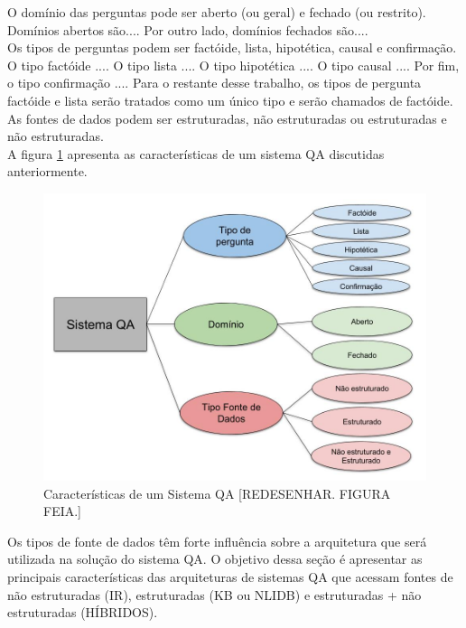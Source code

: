 \documentclass{article}
\begin{document}
O domínio das perguntas pode ser aberto (ou geral) e fechado (ou restrito). Domínios abertos são.... Por outro lado, domínios fechados são....\\

Os tipos de perguntas podem ser factóide, lista, hipotética, causal e confirmação. O tipo factóide .... O tipo lista .... O tipo hipotética .... O tipo causal .... Por fim, o tipo confirmação .... Para o restante desse trabalho, os tipos de pergunta factóide e lista serão tratados como um único tipo e serão chamados de factóide.\\

As fontes de dados podem ser estruturadas, não estruturadas ou estruturadas e não estruturadas.\\

A figura \ref{fig:SistemaQA} apresenta as características de um sistema QA discutidas anteriormente.\\

\begin{figure}[h!]
\centering
\includegraphics[scale=0.2]{SistemaQA2.jpg}
\caption{Características de um Sistema QA [REDESENHAR. FIGURA FEIA.]}
\label{fig:SistemaQA}
\end{figure}

Os tipos de fonte de dados têm forte influência sobre a arquitetura que será utilizada na solução do sistema QA. O objetivo dessa seção é apresentar as principais características das arquiteturas de sistemas QA que acessam fontes de não estruturadas (IR), estruturadas (KB ou NLIDB) e estruturadas + não estruturadas (HÍBRIDOS).\\
\end{document}
